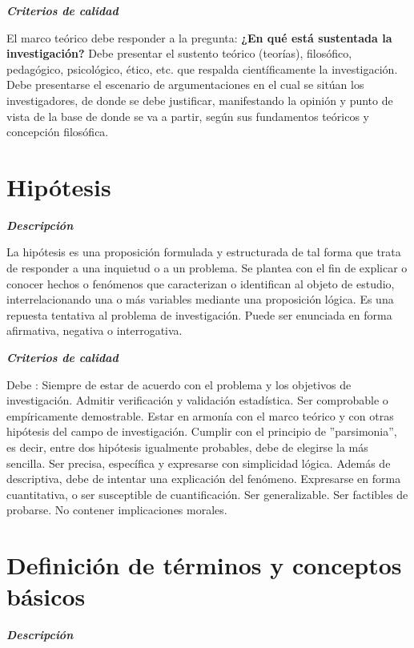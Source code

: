     \textbf{\textit{Criterios de calidad}}
    
    El marco teórico debe responder a la pregunta: \textbf{¿En qué está sustentada la investigación?}
    Debe presentar el sustento teórico (teorías), filosófico, pedagógico, psicológico, ético, etc. que respalda científicamente la investigación.
    Debe presentarse el escenario de argumentaciones en el cual se sitúan los investigadores, de donde se debe justificar, manifestando la opinión y punto de vista de la base de donde se va a partir, según sus fundamentos teóricos y concepción filosófica.

\section{Hipótesis}

    \textbf{\textit{Descripción}}
    
    La hipótesis es una proposición formulada y estructurada de tal forma que trata de responder a una inquietud o a un problema.
    Se plantea con el fin de explicar o conocer hechos o fenómenos que caracterizan o identifican al objeto de estudio, interrelacionando una o más variables mediante una proposición lógica.
    Es una repuesta tentativa al problema de investigación.
    Puede ser enunciada en forma afirmativa, negativa o interrogativa.
    
    \textbf{\textit{Criterios de calidad}}
    
    Debe :
    Siempre de estar de acuerdo con el problema y los objetivos de investigación.
    Admitir verificación y validación estadística.
    Ser comprobable o empíricamente demostrable.
    Estar en armonía con el marco teórico y con otras hipótesis del campo de investigación.
    Cumplir con el principio de ”parsimonia”, es decir, entre dos hipótesis igualmente probables, debe de elegirse la más sencilla.
    Ser precisa, específica y expresarse con simplicidad lógica. Además de descriptiva, debe de intentar una explicación del fenómeno.
    Expresarse en forma cuantitativa, o ser susceptible de cuantificación.
    Ser generalizable.
    Ser factibles de probarse.
    No contener implicaciones morales.

\section{Definición de términos y conceptos básicos}

    \textbf{\textit{Descripción}}
    
